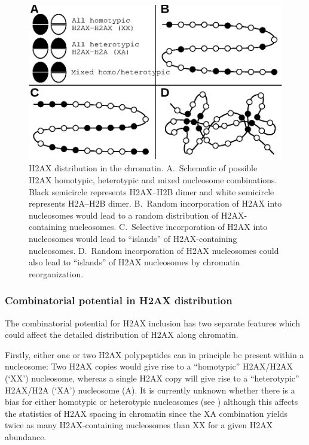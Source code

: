 \begin{figure}
\includegraphics{h2ax-review/figs/Fig6}
\caption[H2AX distribution in the chromatin]%
        {H2AX distribution in the chromatin.
          A.~Schematic of possible H2AX homotypic, heterotypic and
          mixed nucleosome combinations. Black semicircle represents
          H2AX--H2B dimer and white semicircle represents H2A--H2B
          dimer.
          B.~Random incorporation of H2AX into nucleosomes would lead
          to a random distribution of H2AX-containing nucleosomes.
          C.~Selective incorporation of H2AX into nucleosomes would
          lead to ``islands'' of H2AX-containing nucleosomes.
          D.~Random incorporation of H2AX nucleosomes could also lead
          to ``islands'' of H2AX nucleosomes by chromatin
          reorganization.}
\label{fig:h2ax-review:H2AX-distribution}
\end{figure}

\subsubsection{Combinatorial potential in H2AX distribution}
The combinatorial potential for H2AX inclusion has two separate
features which could affect the detailed distribution of H2AX along
chromatin.

Firstly, either one or two H2AX polypeptides can in principle be
present within a nucleosome: Two H2AX copies would give rise to a
``homotypic'' H2AX/H2AX (`XX') nucleosome, whereas a single H2AX copy
will give rise to a ``heterotypic'' H2AX/H2A (`XA') nucleosome
(A).
It is currently unknown whether there is a bias for either homotypic
or heterotypic nucleosomes (see
) although this affects the
statistics of H2AX spacing in chromatin since the XA combination
yields twice as many H2AX-containing nucleosomes than XX for a given
H2AX abundance.

